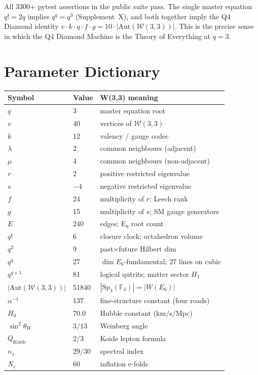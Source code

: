 \documentclass[12pt,a4paper]{article}
\newcommand{\W}{\mathcal{W}(3,3)}
\newcommand{\Sp}{\mathrm{Sp}_4(\mathbb{F}_3)}
\begin{document}
All 3300+ pytest assertions in the public suite pass. The single master
equation $q!=2q$ implies $q^q=q^3$ (Supplement~X), and both together
imply the Q4 Diamond identity $v\cdot k\cdot q\cdot f\cdot g=10\cdot|\mathrm{Aut}(\W)|$.
This is the precise sense in which the Q4 Diamond Machine is the
Theory of Everything at $q=3$.

\appendix

\section{Parameter Dictionary}

\begin{center}
\begin{longtable}{lll}
\toprule
Symbol & Value & W(3,3) meaning\\
\midrule
$q$ & 3 & master equation root\\
$v$ & 40 & vertices of $\W$\\
$k$ & 12 & valency / gauge codec\\
$\lambda$ & 2 & common neighbours (adjacent)\\
$\mu$ & 4 & common neighbours (non-adjacent)\\
$r$ & 2 & positive restricted eigenvalue\\
$s$ & $-4$ & negative restricted eigenvalue\\
$f$ & 24 & multiplicity of $r$; Leech rank\\
$g$ & 15 & multiplicity of $s$; SM gauge generators\\
$E$ & 240 & edges; E$_8$ root count\\
$q!$ & 6 & closure clock; octahedron volume\\
$q^2$ & 9 & past$\times$future Hilbert dim\\
$q^q$ & 27 & $\dim E_6$-fundamental; 27 lines on cubic\\
$q^{q+1}$ & 81 & logical qutrits; matter sector $H_1$\\
$|\mathrm{Aut}(\W)|$ & 51840 & $|\Sp|=|W(E_6)|$\\
$\alpha^{-1}$ & 137 & fine-structure constant (four roads)\\
$H_0$ & 70.0 & Hubble constant (km/s/Mpc)\\
$\sin^2\theta_W$ & $3/13$ & Weinberg angle\\
$Q_\mathrm{Koide}$ & $2/3$ & Koide lepton formula\\
$n_s$ & $29/30$ & spectral index\\
$N_e$ & 60 & inflation e-folds\\
\bottomrule
\end{longtable}
\end{center}
\end{document}
